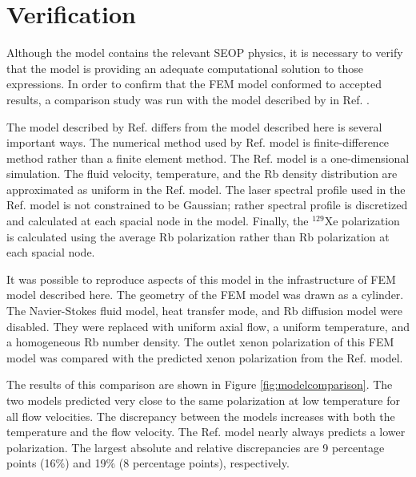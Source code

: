 \section{\label{sec:verification}Verification}
Although the model contains the relevant SEOP physics, it is necessary to verify that the model is providing an adequate computational solution to those expressions. In order to confirm that the FEM model conformed to accepted results, a comparison study was run with the model described by in Ref. \cite{Freeman2014}. 

The model described by Ref. \cite{Freeman2014} differs from the model described here is several important ways. The numerical method used by Ref. \cite{Freeman2014} model is finite-difference method rather than a finite element method. The Ref. \cite{Freeman2014} model is a one-dimensional simulation. The fluid velocity, temperature, and the Rb density distribution are approximated as uniform in the Ref. \cite{Freeman2014} model. The laser spectral profile used in the Ref. \cite{Freeman2014} model is not constrained to be Gaussian; rather spectral profile is discretized and calculated at each spacial node in the model. Finally, the $^{129}$Xe polarization is calculated using the average Rb polarization rather than Rb polarization at each spacial node.

It was possible to reproduce aspects of this model in the infrastructure of FEM model described here. The geometry of the FEM model was drawn as a cylinder. The Navier-Stokes fluid model, heat transfer mode, and Rb diffusion model were disabled. They were replaced with uniform axial flow, a uniform temperature, and a homogeneous Rb number density. The outlet xenon polarization of this FEM model was compared with the predicted xenon polarization from the Ref. \cite{Freeman2014} model.  

The results of this comparison are shown in Figure \ref{fig:modelcomparison}. The two models predicted very close to the same polarization at low temperature for all flow velocities. The discrepancy between the models increases with both the temperature and the flow velocity. The Ref. \cite{Freeman2014} model nearly always predicts a lower polarization. The largest absolute and relative discrepancies are 9 percentage points (16\%) and 19\% (8 percentage points), respectively.

